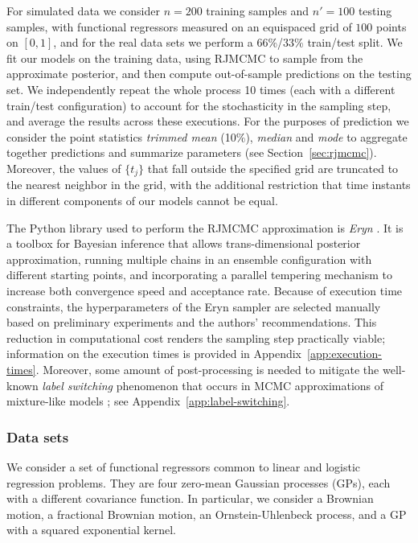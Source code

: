 \documentclass{article}
\numberwithin{equation}{section}
\theoremstyle{plain}
\theoremstyle{definition}
\begin{document}
For simulated data we consider \(n=200\) training samples and \(n'=100\) testing samples, with functional regressors measured on an equispaced grid of \(100\) points on \([0, 1]\), and for the real data sets we perform a 66\%/33\% train/test split. We fit our models on the training data, using RJMCMC to sample from the approximate posterior, and then compute out-of-sample predictions on the testing set. We independently repeat the whole process 10 times (each with a different train/test configuration) to account for the stochasticity in the sampling step, and average the results across these executions. For the purposes of prediction we consider the point statistics \textit{trimmed mean} (10\%), \textit{median} and \textit{mode} to aggregate together predictions and summarize parameters (see Section~\ref{sec:rjmcmc}). Moreover, the values of \(\{t_j\}\) that fall outside the specified grid are truncated to the nearest neighbor in the grid, with the additional restriction that time instants in different components of our models cannot be equal.

The Python library used to perform the RJMCMC approximation is \textit{Eryn} \citep{karnesis2023eryn}. It is a toolbox for Bayesian inference that allows trans-dimensional posterior approximation, running multiple chains in an ensemble configuration with different starting points, and incorporating a parallel tempering mechanism \citep{hukushima1996exchange} to increase both convergence speed and acceptance rate. Because of execution time constraints, the hyperparameters of the Eryn sampler are selected manually based on preliminary experiments and the authors' recommendations. This reduction in computational cost renders the sampling step practically viable; information on the execution times is provided in Appendix~\ref{app:execution-times}. Moreover, some amount of post-processing is needed to mitigate the well-known \textit{label switching} phenomenon that occurs in MCMC approximations of mixture-like models \citep{stephens2000dealing}; see Appendix~\ref{app:label-switching}.

\subsubsection*{Data sets}

We consider a set of functional regressors common to linear and logistic regression problems. They are four zero-mean Gaussian processes (GPs), each with a different covariance function. In particular, we consider a Brownian motion, a fractional Brownian motion, an Ornstein-Uhlenbeck process, and a GP with a squared exponential kernel.
\end{document}
